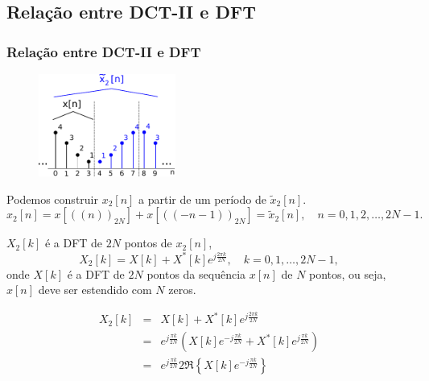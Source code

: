\subsection{Relação entre DCT-II e DFT}
\begin{frame}[allowframebreaks]
  \frametitle{Relação entre DCT-II e DFT}

    \begin{figure}[ht]
    \centering
    \includegraphics[width=0.4\textwidth]{images/dct-2-ex.pdf}
    \label{fig:DCT-II-a}
    \end{figure}

  Podemos construir $x_2 [n]$ a partir de um período de $\tilde{x}_2[n]$.
  \begin{equation}
  x_2 [n] = x\left[ ((n))_{2N} \right] + x\left[ ((-n-1))_{2N} \right] = \tilde{x}_2[n] , \quad n = 0, 1, 2, \ldots, 2N-1.
  \end{equation}

  \framebreak
  $X_2[k]$ é a DFT de $2N$ pontos de $x_2 [n]$,
  \begin{equation}
  X_2[k] = X[k] + X^\ast [k] e^{j \frac{2 \pi k}{2N}} , \quad k = 0,1, \ldots, 2N-1,
  \end{equation}
  onde $X[k]$ é a DFT de $2N$ pontos da sequência $x[n]$ de $N$ pontos, ou seja, $x[n]$ deve ser estendido com $N$ zeros.


  \framebreak

  \begin{eqnarray}
  X_2[k] &=& X[k] + X^\ast[k] e^{j \frac{2 \pi k}{2N}} \\
        &=& e^{j \frac{\pi k}{2N}} \left( X[k] e^{-j \frac{\pi k}{2N}} + X^\ast[k] e^{j \frac{\pi k}{2N}} \right) \\
        &=& e^{j \frac{\pi k}{2N}} 2 \Re \left\{ X[k] e^{-j \frac{\pi k}{2N}} \right\}
  \end{eqnarray}


\end{frame}
